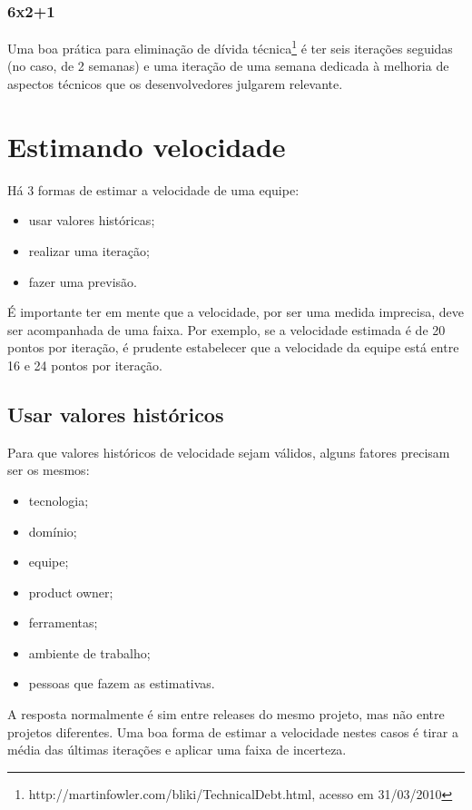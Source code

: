 \documentclass[a4paper,abntfigtabnum,noindentfirst]{abnt}
\begin{document}
\subsection{6x2+1}

Uma boa prática para eliminação de dívida técnica\footnote{http://martinfowler.com/bliki/TechnicalDebt.html, acesso em 31/03/2010} é ter seis iterações seguidas (no caso, de 2 semanas) e uma iteração de uma semana dedicada à melhoria de aspectos técnicos que os desenvolvedores julgarem relevante.



\chapter{Estimando velocidade}
\label{capitulo-estimando-velocidade}

Há 3 formas de estimar a velocidade de uma equipe:
\begin{itemize}
 \item usar valores históricas;
 \item realizar uma iteração;
 \item fazer uma previsão.
\end{itemize}

É importante ter em mente que a velocidade, por ser uma medida imprecisa, deve ser acompanhada de uma faixa. Por exemplo, se a velocidade estimada é de 20 pontos por iteração, é prudente estabelecer que a velocidade da equipe está entre 16 e 24 pontos por iteração.


\section{Usar valores históricos}

Para que valores históricos de velocidade sejam válidos, alguns fatores precisam ser os mesmos:
\begin{itemize}
 \item tecnologia;
 \item domínio;
 \item equipe;
 \item product owner;
 \item ferramentas;
 \item ambiente de trabalho;
 \item pessoas que fazem as estimativas.
\end{itemize}

A resposta normalmente é sim entre releases do mesmo projeto, mas não entre projetos diferentes. Uma boa forma de estimar a velocidade nestes casos é tirar a média das últimas iterações e aplicar uma faixa de incerteza.
\end{document}
